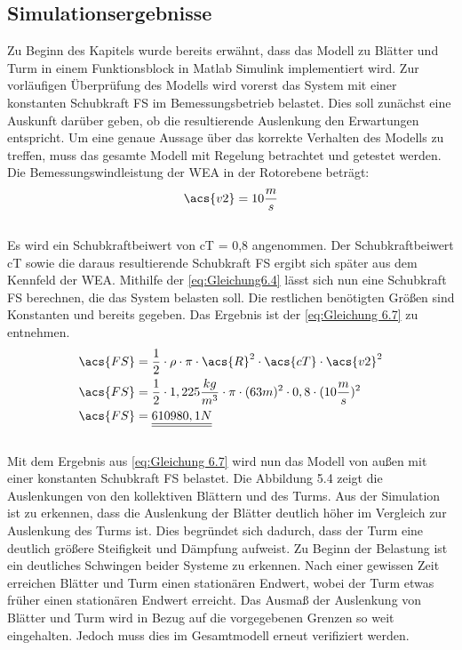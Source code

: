 \subsection{Simulationsergebnisse}
Zu Beginn des Kapitels wurde bereits erwähnt, dass das Modell zu Blätter und Turm in einem Funktionsblock in Matlab Simulink implementiert wird. Zur vorläufigen Überprüfung des Modells wird vorerst das System mit einer konstanten Schubkraft \acs{FS} im Bemessungsbetrieb belastet. Dies soll zunächst eine Auskunft darüber geben, ob die resultierende Auslenkung den Erwartungen entspricht. Um eine genaue Aussage über das korrekte Verhalten des Modells zu treffen, muss das gesamte Modell mit Regelung betrachtet und getestet werden. 
Die Bemessungswindleistung der WEA in der Rotorebene beträgt:\begin{align}\acs{v2} = 10 \frac {m}{s}\end{align}
\\
Es wird ein Schubkraftbeiwert von \acs{cT} = 0,8 angenommen. Der Schubkraftbeiwert \acs{cT} sowie die daraus resultierende Schubkraft \acs{FS} ergibt sich später aus dem Kennfeld der WEA. Mithilfe der \autoref{eq:Gleichung6.4} lässt sich nun eine Schubkraft \acs{FS} berechnen, die das System belasten soll. Die restlichen benötigten Größen sind Konstanten und bereits gegeben. Das Ergebnis ist der \autoref{eq:Gleichung 6.7} zu entnehmen.
\\
\begin{align}
    \acs{FS} &= \frac{1}{2} \cdot \rho \cdot \pi \cdot \acs{R}^2 \cdot \acs{cT} \cdot \acs{v2}^2 \label{eq:Gleichung6.6} \\
    \acs{FS} &= \frac{1}{2} \cdot 1,225 \frac{kg}{m^3} \cdot \pi \cdot (63m)^2 \cdot 0,8 \cdot (10 \frac{m}{s})^2 \nonumber \\
    \acs{FS} &= \underline{\underline{610980,1 N}} \label{eq:Gleichung 6.7}
\end{align}
\\
Mit dem Ergebnis aus \autoref{eq:Gleichung 6.7} wird nun das Modell von außen mit einer konstanten Schubkraft \acs{FS} belastet. Die Abbildung 5.4 zeigt die Auslenkungen von den kollektiven Blättern und des Turms. Aus der Simulation ist zu erkennen, dass die Auslenkung der Blätter deutlich höher im Vergleich zur Auslenkung des Turms ist. Dies begründet sich dadurch, dass der Turm eine deutlich größere Steifigkeit und Dämpfung aufweist. Zu Beginn der Belastung ist ein deutliches Schwingen beider Systeme zu erkennen. Nach einer gewissen Zeit erreichen Blätter und Turm einen stationären Endwert, wobei der Turm etwas früher einen stationären Endwert erreicht. Das Ausmaß der Auslenkung von Blätter und Turm wird in Bezug auf die vorgegebenen Grenzen so weit eingehalten. Jedoch muss dies im Gesamtmodell erneut verifiziert werden.
